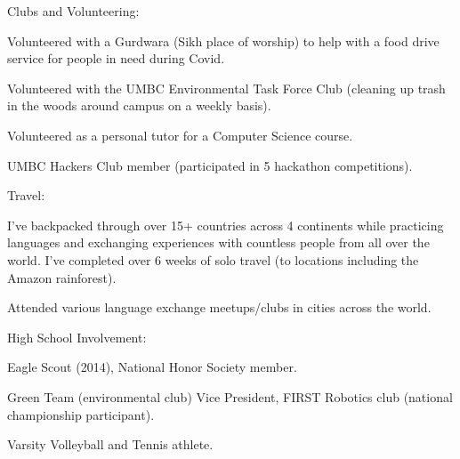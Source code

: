 
\begin{cventries}
  \cventry
    {Clubs and Volunteering:} %
    {} %
    {} %
    {} %
    {
      \begin{cvitems} %
      \item {Volunteered with a Gurdwara (Sikh place of worship) to help with a food drive service for people in need during Covid.}
      \item {Volunteered with the UMBC Environmental Task Force Club (cleaning up trash in the woods around campus on a weekly basis).}
      \item {Volunteered as a personal tutor for a Computer Science course.}
      \item {UMBC Hackers Club member (participated in 5 hackathon competitions).}
      \end{cvitems}
    }

  \cventry
    {Travel:} %
    {} %
    {} %
    {} %
    {
      \begin{cvitems} %
      \item {I've backpacked through over 15+ countries across 4 continents while practicing languages and exchanging experiences with countless people from all over the world.  I've completed over 6 weeks of solo travel (to locations including the Amazon rainforest).}
      \item {Attended various language exchange meetups/clubs in cities across the world.}
      \end{cvitems}
    }


  \cventry
    {High School Involvement:} %
    {} %
    {} %
    {} %
    {
      \begin{cvitems} %
        \item {Eagle Scout (2014), National Honor Society member.}
        \item {Green Team (environmental club) Vice President, FIRST Robotics club (national championship participant).}
        \item {Varsity Volleyball and Tennis athlete.}
      \end{cvitems}
    }

\end{cventries}

